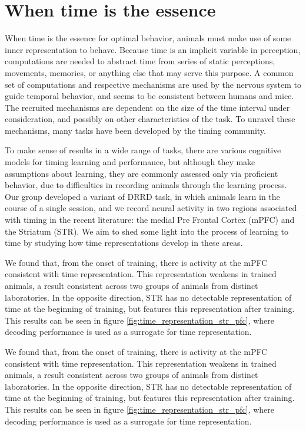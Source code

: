 \chapter{When time is the essence}

When time is the essence for optimal behavior, animals must make use of some inner representation to behave. Because time is an implicit variable in perception, computations are needed to abstract time from series of static perceptions, movements, memories, or anything else that may serve this purpose. A common set of computations and respective mechanisms are used by the nervous system to guide temporal behavior, and seems to be consistent between humans and mice. The recruited mechanisms are dependent on the size of the time interval under consideration, and possibly on other characteristics of the task. To unravel these mechanisms, many tasks have been developed by the timing community.

To make sense of results in a wide range of tasks, there are various cognitive models for timing learning and performance, but although they make assumptions about learning, they are commonly assessed only via proficient behavior, due to difficulties in recording animals through the learning process. Our group developed a variant of DRRD task, in which animals learn in the course of a single session, and we record neural activity in two regions associated with timing in the recent literature: the medial Pre Frontal Cortex (mPFC) and the Striatum (STR). We aim to shed some light into the process of learning to time by studying how time representations develop in these areas.

We found that, from the onset of training, there is activity at the mPFC consistent with time representation. This representation weakens in trained animals, a result consistent across two groups of animals from distinct laboratories. In the opposite direction, STR has no detectable representation of time at the beginning of training, but features this representation after training. This results can be seen in figure \ref{fig:time_representation_str_pfc}, where decoding performance is used as a surrogate for time representation.

We found that, from the onset of training, there is activity at the mPFC consistent with time representation. This representation weakens in trained animals, a result consistent across two groups of animals from distinct laboratories. In the opposite direction, STR has no detectable representation of time at the beginning of training, but features this representation after training. This results can be seen in figure \ref{fig:time_representation_str_pfc}, where decoding performance is used as a surrogate for time representation.


